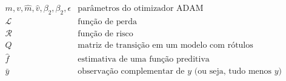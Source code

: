\documentclass[12pt,twoside,brazilian]{book}
\begin{document}
\begin{displaymath}
\begin{array}{ll}
   m,v,\hat m, \hat v, \beta_2, \beta_2, \epsilon & \text{parâmetros do otimizador ADAM}\\
   \mathcal L & \text{função de perda}\\
   \mathcal R & \text{função de risco}\\
   Q & \text{matriz de transição em um modelo com rótulos complementares}\\
   \hat f & \text{estimativa de uma função preditiva}\\
   \bar y & \text{observação complementar de } y \text{ (ou seja, tudo menos } y \text{)}
\end{array}
\end{displaymath}

\clearpage


\disablenewpage{\listoffigures}

\disablenewpage{\listoftables}


\tableofcontents

\egroup %

\end{document}
